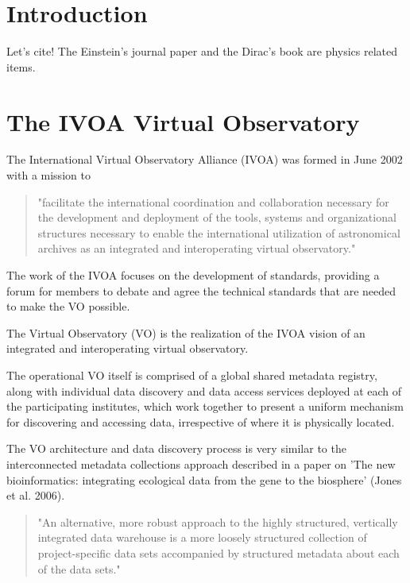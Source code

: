 \documentclass{article}
\begin{document}
\section{Introduction}

Let's cite! The Einstein's journal paper \cite{einstein} and the Dirac's 
book \cite{dirac} are physics related items. 

\section{The IVOA Virtual Observatory}

The International Virtual Observatory Alliance (IVOA)
was formed in June 2002 with a mission to
\begin{quote}
"facilitate the international coordination and collaboration
necessary for the development and deployment of the tools, systems and
organizational structures necessary to enable the international utilization of
astronomical archives as an integrated and interoperating virtual observatory."
\end{quote}

The work of the IVOA focuses on the development of standards, providing a forum
for members to debate and agree the technical standards that are needed to make
the VO possible.

The Virtual Observatory (VO) is the realization of the IVOA vision of an
integrated and interoperating virtual observatory.

The operational VO itself is comprised of a global shared metadata registry,
along with individual data discovery and data access services deployed at each
of the participating institutes, which work together to present a uniform
mechanism for discovering and accessing data, irrespective of where it is
physically located.

The VO architecture and data discovery process is very similar to the
interconnected metadata collections approach described in a paper on 'The new
bioinformatics: integrating ecological data from the gene to the biosphere'
(Jones et al. 2006).

\begin{quote}
"An alternative, more robust approach to the highly structured, vertically integrated
data warehouse is a more loosely structured collection of project-specific data sets
accompanied by structured metadata about each of the data sets."
\end{quote}
\end{document}
